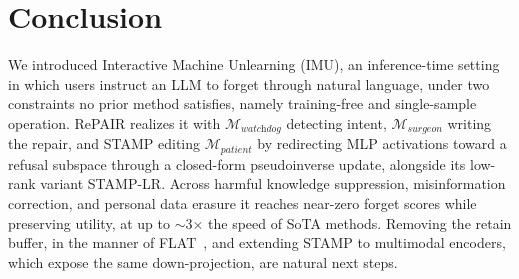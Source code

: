 
\section{Conclusion}
We introduced Interactive Machine Unlearning (IMU), an inference-time setting in which users instruct an LLM to forget through natural language, under two constraints no prior method satisfies, namely training-free and single-sample operation. RePAIR realizes it with $\mathcal{M}_{\textit{watchdog}}$ detecting intent, $\mathcal{M}_{\textit{surgeon}}$ writing the repair, and STAMP editing $\mathcal{M}_{\textit{patient}}$ by redirecting MLP activations toward a refusal subspace through a closed-form pseudoinverse update, alongside its low-rank variant STAMP-LR. Across harmful knowledge suppression, misinformation correction, and personal data erasure it reaches near-zero forget scores while preserving utility, at up to $\sim$3$\times$ the speed of SoTA methods. Removing the retain buffer, in the manner of FLAT~\cite{wang2024llm}, and extending STAMP to multimodal encoders, which expose the same down-projection, are natural next steps.
